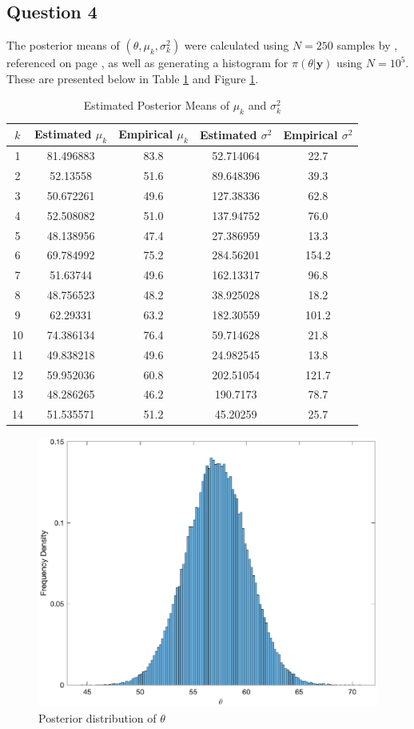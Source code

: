 \documentclass[10pt,a4paper,notitlepage]{article}
\newcommand{\y}{\mathbf{y}}
\begin{document}
\subsection*{\centering Question 4}
The posterior means of $(\theta,\mu_{k},\sigma_{k}^{2})$ were calculated using $N=250$ samples by , referenced on page \pageref{cd:3}, as well as generating a histogram for $\pi(\theta |\y)$ using $N=10^{5}$. These are presented below in Table \ref{tb:1} and Figure \ref{fg:1}.
\begin{table}[H]
\centering
\begin{tabular}{c|cc|cc} 
$k$ & Estimated $\mu_{k}$ & Empirical $\mu_{k}$ & Estimated $\sigma^{2}$ & Empirical $\sigma^{2}$\\ \hline
1 & 81.496883 & 83.8 & 52.714064 & 22.7\\ 
2 & 52.13558 & 51.6 & 89.648396 & 39.3\\ 
3 & 50.672261 & 49.6 & 127.38336 & 62.8\\ 
4 & 52.508082 & 51.0 & 137.94752 & 76.0\\ 
5 & 48.138956 & 47.4 & 27.386959 & 13.3\\ 
6 & 69.784992 & 75.2 & 284.56201 & 154.2\\ 
7 & 51.63744 & 49.6 & 162.13317 & 96.8\\ 
8 & 48.756523 & 48.2 & 38.925028 & 18.2\\ 
9 & 62.29331 & 63.2 & 182.30559 & 101.2\\ 
10 & 74.386134 & 76.4 & 59.714628 & 21.8\\ 
11 & 49.838218 & 49.6 & 24.982545 & 13.8\\ 
12 & 59.952036 & 60.8 & 202.51054 & 121.7\\ 
13 & 48.286265 & 46.2 & 190.7173 & 78.7\\ 
14 & 51.535571 & 51.2 & 45.20259 & 25.7
\end{tabular}
\caption{Estimated Posterior Means of $\mu_{k}$ and $\sigma^{2}_{k}$}\label{tb:1}
\end{table}
\begin{figure}[H]
\centering
\includegraphics[width=13cm]{Image_1}
\caption{Posterior distribution of $\theta$}\label{fg:1}
\end{figure}
\end{document}
